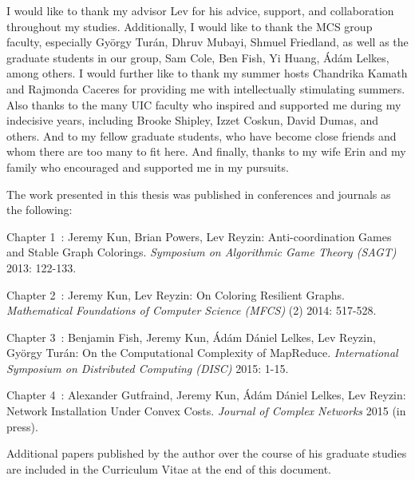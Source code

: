 I would like to thank my advisor Lev for his advice, support, and collaboration
throughout my studies. Additionally, I would like to thank the MCS group
faculty, especially Gy\"orgy Tur\'an, Dhruv Mubayi, Shmuel Friedland, as well
as the graduate students in our group, Sam Cole, Ben Fish, Yi Huang, \'Ad\'am
Lelkes, among others. I would further like to thank my summer hosts Chandrika
Kamath and Rajmonda Caceres for providing me with intellectually stimulating
summers. Also thanks to the many UIC faculty who inspired and
supported me during my indecisive years, including Brooke Shipley, Izzet
Coskun, David Dumas, and others. And to my fellow graduate students, who have
become close friends and whom there are too many to fit here. And finally,
thanks to my wife Erin and my family who encouraged and supported me in my
pursuits.

\vspace{1cm}
\noindent The work presented in this thesis was published in conferences and journals as the following:
\vspace{0.5cm}

\noindent Chapter 1~\cite{KunPR13}: Jeremy Kun, Brian Powers, Lev
Reyzin: Anti-coordination Games and Stable Graph Colorings. \textit{Symposium
on Algorithmic Game Theory (SAGT)} 2013: 122-133.

\noindent Chapter 2~\cite{KunR14}: Jeremy Kun, Lev Reyzin: On Coloring
Resilient Graphs. \textit{Mathematical Foundations of Computer Science (MFCS)}
(2) 2014: 517-528.

\noindent Chapter 3~\cite{FishKLRT15}: Benjamin Fish, Jeremy Kun,
\'Ad\'am D\'aniel Lelkes, Lev Reyzin, Gy\"orgy Tur\'an: On the
Computational Complexity of MapReduce. \textit{International Symposium on
Distributed Computing (DISC)} 2015: 1-15.

\noindent Chapter 4~\cite{GutfraindKLR15}: Alexander Gutfraind, Jeremy Kun,
\'Ad\'am D\'aniel Lelkes, Lev Reyzin: Network Installation Under Convex Costs.
\textit{Journal of Complex Networks} 2015 (in press).

Additional papers published by the author over the course of his
graduate studies are included in the Curriculum Vitae at the end of
this document.

